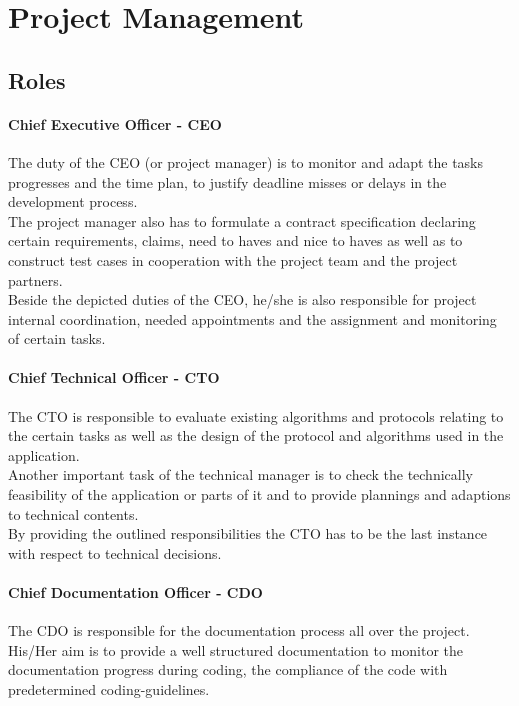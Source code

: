 
\section{Project Management}

\subsection{Roles}

\paragraph{Chief Executive Officer - CEO}
\label{sec:pm:roles:ceo}
The duty of the CEO (or project manager) is to monitor and adapt the tasks progresses and the time plan, 
to justify deadline misses or delays in the development process.\\

The project manager also has to formulate a contract specification declaring certain requirements, 
claims, need to haves and nice to haves as well as to construct test cases in cooperation with the project 
team and the project partners.\\

Beside the depicted duties of the CEO, he/she is also responsible for project internal coordination, 
needed appointments and the assignment and monitoring of certain tasks.\\


\paragraph{Chief Technical Officer - CTO}
\label{sec:pm:roles:cto}
The CTO is responsible to evaluate existing algorithms and protocols relating to the certain 
tasks as well as the design of the protocol and algorithms used in the application.\\

Another important task of the technical manager is to check the technically feasibility 
of the application or parts of it and to provide plannings and adaptions to technical contents.\\

By providing the outlined responsibilities the CTO has to be the last instance with respect to technical decisions.\\


\paragraph{Chief Documentation Officer - CDO}
\label{sec:pm:roles:cdo}
The CDO is responsible for the documentation process all over the project. 
His/Her aim is to provide a well structured documentation to monitor the documentation progress during coding, 
the compliance of the code with predetermined coding-guidelines.\\

